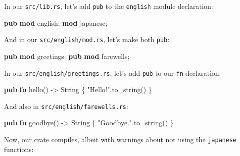 \documentclass[a4paper,]{book}
\newenvironment{Shaded}{\begin{snugshade}}{\end{snugshade}}
\newcommand{\KeywordTok}[1]{\textcolor[rgb]{0.13,0.29,0.53}{\textbf{{#1}}}}
\newcommand{\DataTypeTok}[1]{\textcolor[rgb]{0.13,0.29,0.53}{{#1}}}
\newcommand{\StringTok}[1]{\textcolor[rgb]{0.31,0.60,0.02}{{#1}}}
\newcommand{\NormalTok}[1]{{#1}}
\begin{document}
In our \texttt{src/lib.rs}, let's add \texttt{pub} to the
\texttt{english} module declaration:

\begin{Shaded}
\begin{Highlighting}[]
\KeywordTok{pub} \KeywordTok{mod} \NormalTok{english;}
\KeywordTok{mod} \NormalTok{japanese;}
\end{Highlighting}
\end{Shaded}

And in our \texttt{src/english/mod.rs}, let's make both \texttt{pub}:

\begin{Shaded}
\begin{Highlighting}[]
\KeywordTok{pub} \KeywordTok{mod} \NormalTok{greetings;}
\KeywordTok{pub} \KeywordTok{mod} \NormalTok{farewells;}
\end{Highlighting}
\end{Shaded}

In our \texttt{src/english/greetings.rs}, let's add \texttt{pub} to our
\texttt{fn} declaration:

\begin{Shaded}
\begin{Highlighting}[]
\KeywordTok{pub} \KeywordTok{fn} \NormalTok{hello() -> }\DataTypeTok{String} \NormalTok{\{}
    \StringTok{"Hello!"}\NormalTok{.to_string()}
\NormalTok{\}}
\end{Highlighting}
\end{Shaded}

And also in \texttt{src/english/farewells.rs}:

\begin{Shaded}
\begin{Highlighting}[]
\KeywordTok{pub} \KeywordTok{fn} \NormalTok{goodbye() -> }\DataTypeTok{String} \NormalTok{\{}
    \StringTok{"Goodbye."}\NormalTok{.to_string()}
\NormalTok{\}}
\end{Highlighting}
\end{Shaded}

Now, our crate compiles, albeit with warnings about not using the
\texttt{japanese} functions:
\end{document}
